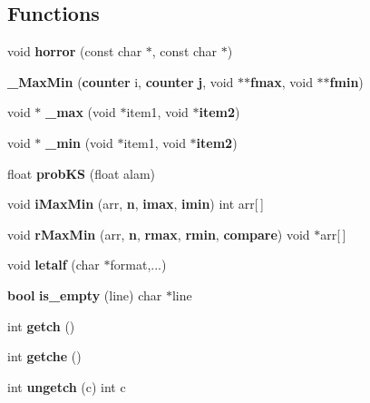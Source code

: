 \subsection*{Functions}
\begin{CompactItemize}
\item 
void {\bf horror} (const char $\ast$, const char $\ast$)
\item 
{\bf \_\-Max\-Min} ({\bf counter} i, {\bf counter} {\bf j}, void $\ast$$\ast${\bf fmax}, void $\ast$$\ast${\bf fmin})
\item 
void $\ast$ {\bf \_\-max} (void $\ast$item1, void $\ast${\bf item2})
\item 
void $\ast$ {\bf \_\-min} (void $\ast$item1, void $\ast${\bf item2})
\item 
float {\bf prob\-KS} (float alam)
\item 
void {\bf i\-Max\-Min} (arr, {\bf n}, {\bf imax}, {\bf imin}) int arr[$\,$]
\item 
void {\bf r\-Max\-Min} (arr, {\bf n}, {\bf rmax}, {\bf rmin}, {\bf compare}) void $\ast$arr[$\,$]
\item 
void {\bf letalf} (char $\ast$format,...)
\item 
{\bf bool} {\bf is\_\-empty} (line) char $\ast$line
\item 
int {\bf getch} ()
\item 
int {\bf getche} ()
\item 
int {\bf ungetch} (c) int c
\end{CompactItemize}
